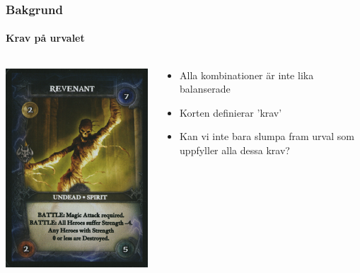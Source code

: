 \documentclass{beamer}
\begin{document}
\begin{frame}
    \frametitle{Bakgrund}
    \framesubtitle{Krav på urvalet}
    
    \begin{columns}%
        \begin{column}{.5\textwidth}
            \centering
            \includegraphics[width=\textwidth]{Rvnant.png}
        \end{column}
        \begin{column}{.5\textwidth}
            \begin{itemize}
                \item Alla kombinationer är inte lika balanserade
                \pause
                \item Korten definierar 'krav'
                \item Kan vi inte bara slumpa fram urval som uppfyller alla dessa krav?
            \end{itemize}
        \end{column}
    \end{columns}
\end{frame}
\end{document}
